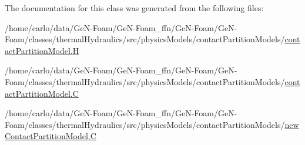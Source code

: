The documentation for this class was generated from the following files\+:\begin{DoxyCompactItemize}
\item 
/home/carlo/data/\+Ge\+N-\/\+Foam/\+Ge\+N-\/\+Foam\+\_\+ffn/\+Ge\+N-\/\+Foam/\+Ge\+N-\/\+Foam/classes/thermal\+Hydraulics/src/physics\+Models/contact\+Partition\+Models/\hyperlink{contactPartitionModel_8H}{contact\+Partition\+Model.\+H}\item 
/home/carlo/data/\+Ge\+N-\/\+Foam/\+Ge\+N-\/\+Foam\+\_\+ffn/\+Ge\+N-\/\+Foam/\+Ge\+N-\/\+Foam/classes/thermal\+Hydraulics/src/physics\+Models/contact\+Partition\+Models/\hyperlink{contactPartitionModel_8C}{contact\+Partition\+Model.\+C}\item 
/home/carlo/data/\+Ge\+N-\/\+Foam/\+Ge\+N-\/\+Foam\+\_\+ffn/\+Ge\+N-\/\+Foam/\+Ge\+N-\/\+Foam/classes/thermal\+Hydraulics/src/physics\+Models/contact\+Partition\+Models/\hyperlink{newContactPartitionModel_8C}{new\+Contact\+Partition\+Model.\+C}\end{DoxyCompactItemize}
